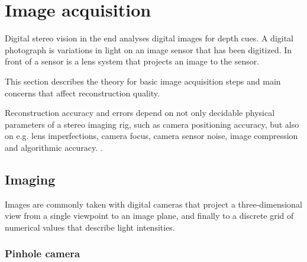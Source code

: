 


\section{Image acquisition}


Digital stereo vision in the end analyses digital images for depth cues.
A digital photograph is variations in light on an image sensor that has been digitized.
In front of a sensor is a lens system that projects an image to the sensor.

This section describes the theory for basic image acquisition steps and main concerns that affect reconstruction quality.


Reconstruction accuracy and errors depend on not only decidable physical parameters of a stereo imaging rig, such as camera positioning accuracy, but also on e.g. lens imperfections, camera focus, camera sensor noise, image compression and algorithmic accuracy. \cite{hollsten2013imagequality, kyto2011method,rieke2009evaluation}.

\subsection{Imaging} \label{sec:imaging} %

Images are commonly taken with digital cameras that project a three-dimensional view from a single viewpoint to an image plane, and finally to a discrete grid of numerical values that describe light intensities.


\subsubsection{Pinhole camera} \label{sec:pinhole} %

